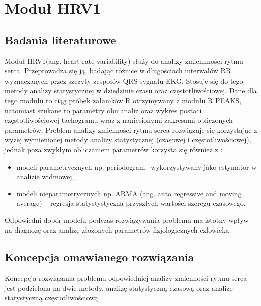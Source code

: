\newcommand{\tab}{\hspace*{2em}}
\section{Moduł HRV1}

\subsection{Badania literaturowe}

\tab Moduł HRV1(ang. heart rate variability) służy do analizy zmiennności rytmu serca. Przeprowadza się ją,  badając różnice w  długościach interwałów RR wyznaczanych przez szczyty zespołów QRS sygnału EKG. Stosuje się do tego metody analizy statystycznej w dziedzinie czasu oraz częstotliwościowej. Dane dla tego modułu to ciąg próbek załamków R otrzymywany z modułu R\underline{  }PEAKS, natomiast szukane to parametry obu analiz oraz wykres postaci częstotliwościowej tachogramu wraz z naniesionymi zakresami obliczonych parametrów.
Problem analizy zmienności rytmu serca rozwiązuje się korzystając  z wyżej wymienionej metody analizy statystycznej (czasowej i częstotliwościowej), jednak poza zwykłym obliczaniem parametrów  korzysta się również z :

\vspace{10mm}
\begin{itemize} \itemsep0pt \parskip0pt 
\item modeli parametrycznych np. periodogram –wykorzystywany jako estymator w analizie widmowej,
\item modeli nieparametrycznych np. ARMA (ang. auto regressive and moving average) – regresja statystystyczna przyszłych wartości szeregu czasowego.
\end{itemize}

\vspace{10mm}

Odpowiedni dobór modelu podczas rozwiązywania problemu ma istotny wpływ na diagnozę oraz analizę złożonych parametrów fizjologicznych człowieka.

\subsection{Koncepcja omawianego rozwiązania}
\label{sec:concept}

\tab Koncepcja rozwiązania problemu odpowiedniej analizy zmienności rytmu serca jest podzielona na dwie metody, analizę statystyczną czasową oraz analizę statystyczną częstotliwościową. 

